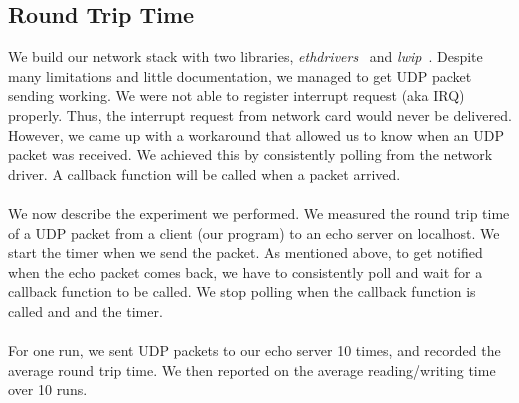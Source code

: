 \subsection{Round Trip Time}
We build our network stack with two libraries, \textit{ethdrivers}~\cite{utillibs55:online} and \textit{lwip}~\cite{lwIPWiki65:online}.
Despite many limitations and little documentation, 
we managed to get UDP packet sending working. 
We were not able to register interrupt request (aka IRQ) properly. 
Thus, the interrupt request from network card would never be delivered.
However, 
we came up with a workaround that allowed us to know when an UDP packet was received.
We achieved this by consistently polling from the network driver. 
A callback function will be called when a packet arrived.\\
\\
We now describe the experiment we performed.
We measured the round trip time of a UDP packet from a client (our program) to an echo server on localhost.
We start the timer when we send the packet.
As mentioned above, to get notified when the echo packet comes back,
we have to consistently poll and wait for a callback function to be called.
We stop polling when the callback function is called and and the timer.\\
\\
For one run, we sent UDP packets to our echo server 10 times, 
and recorded the average round trip time.
We then reported on the average reading/writing time over 10 runs.